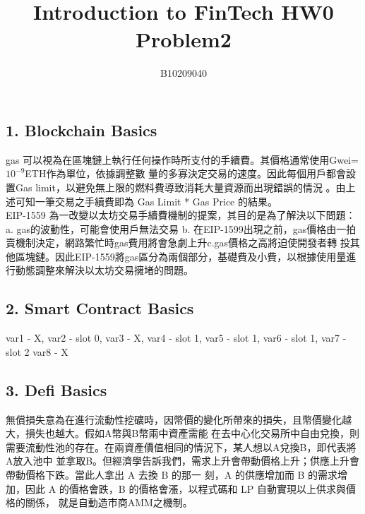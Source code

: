 \documentclass{article}
\title{Introduction to FinTech HW0 Problem2}
\author{B10209040\quad陳彥倫}
\begin{document}
\begin{CJK*}{UTF8}{bsmi}
\maketitle

\begin{spacing}{2}
    \subsection*{1. Blockchain Basics}
    gas 可以視為在區塊鏈上執行任何操作時所支付的手續費。其價格通常使用Gwei=$10^{-9}$ETH作為單位，依據調整數
    量的多寡決定交易的速度。因此每個用戶都會設置Gas limit，以避免無上限的燃料費導致消耗大量資源而出現錯誤的情況
    。由上述可知一筆交易之手續費即為 Gas Limit * Gas Price 的結果。\\
    EIP-1559 為一改變以太坊交易手續費機制的提案，其目的是為了解決以下問題：a. gas的波動性，可能會使用戶無法交易
    b. 在EIP-1599出現之前，gas價格由一拍賣機制決定，網路繁忙時gas費用將會急劇上升c.gas價格之高將迫使開發者轉
    投其他區塊鏈。因此EIP-1559將gas區分為兩個部分，基礎費及小費，以根據使用量進行動態調整來解決以太坊交易擁堵的問題。
\end{spacing}

\begin{spacing}{2}
    \subsection*{2. Smart Contract Basics} 
    var1 - X, var2 - slot 0, var3 - X, var4 - slot 1, var5 - slot 1, var6 - slot 1, var7 - slot 2
    var8 - X
\end{spacing}

\begin{spacing}{2}
    \subsection*{3. Defi Basics} 
    無償損失意為在進行流動性挖礦時，因幣價的變化所帶來的損失，且幣價變化越大，損失也越大。假如A幣與B幣兩中資產需能
    在去中心化交易所中自由兌換，則需要流動性池的存在。在兩資產價值相同的情況下，某人想以A兌換B，即代表將A放入池中
    並拿取B。但經濟學告訴我們，需求上升會帶動價格上升；供應上升會帶動價格下跌。當此人拿出 A 去換 B 的那一
    刻，A 的供應增加而 B 的需求增加，因此 A 的價格會跌，B 的價格會漲，以程式碼和 LP 自動實現以上供求與價格的關係，
    就是自動造市商AMM之機制。
    
\end{spacing}


\end{CJK*}
\end{document}
